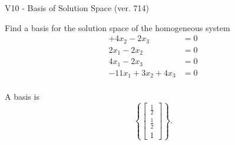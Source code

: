 \begin{exercise}
  \begin{exerciseTitle}V10 - Basis of Solution Space (ver. 714)\end{exerciseTitle}
  \begin{exerciseStatement}
    Find a basis for the solution space of the homogeneous system 
\begin{align*}
 + 4 x_ 2 -2 x_ 3 &= 0  \\ 
  2 x_ 1 -2 x_ 2 &= 0  \\ 
  4 x_ 1 -2 x_ 3 &= 0  \\ 
  -11 x_ 1 + 3 x_ 2 + 4 x_ 3 &= 0  \\ 
 \end{align*}


 
  \end{exerciseStatement}

  \begin{exerciseAnswer}
   A basis is   
\[\left\{\left[\begin{array}{c}
\frac{1}{2} \\
\frac{1}{2} \\
1
\end{array}\right]\right\}.\]

  


  \end{exerciseAnswer}
\end{exercise}